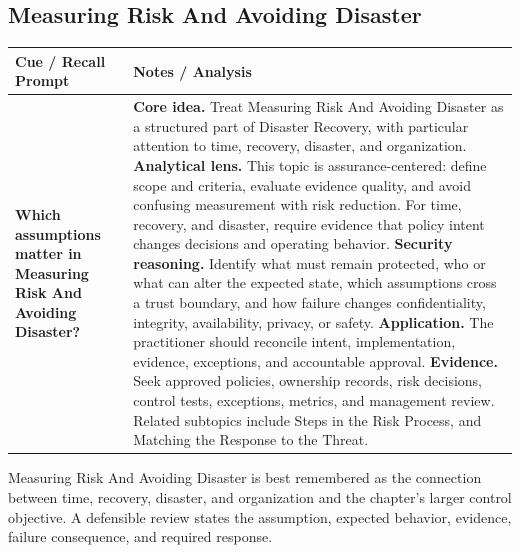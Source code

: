 \documentclass[11pt]{article}
\newcommand{\CornellHeader}{%
\rowcolor{Navy}\color{white}\bfseries Cue / Recall Prompt & \color{white}\bfseries Notes / Analysis\\\hline}
\newcommand{\CornellRow}[2]{%
\cellcolor{CueGray}\RaggedRight\textbf{#1} & \RaggedRight #2\\\hline}
\begin{document}
\subsection*{Measuring Risk And Avoiding Disaster}
\begin{longtable}{>{\RaggedRight\arraybackslash}p{}|>{\RaggedRight\arraybackslash}p{}}
\CornellHeader
\CornellRow{Which assumptions matter in Measuring Risk And Avoiding Disaster?}{\textbf{Core idea.} Treat Measuring Risk And Avoiding Disaster as a structured part of Disaster Recovery, with particular attention to time, recovery, disaster, and organization. \textbf{Analytical lens.} This topic is assurance-centered: define scope and criteria, evaluate evidence quality, and avoid confusing measurement with risk reduction. For time, recovery, and disaster, require evidence that policy intent changes decisions and operating behavior. \textbf{Security reasoning.} Identify what must remain protected, who or what can alter the expected state, which assumptions cross a trust boundary, and how failure changes confidentiality, integrity, availability, privacy, or safety. \textbf{Application.} The practitioner should reconcile intent, implementation, evidence, exceptions, and accountable approval. \textbf{Evidence.} Seek approved policies, ownership records, risk decisions, control tests, exceptions, metrics, and management review. Related subtopics include Steps in the Risk Process, and Matching the Response to the Threat.}
\end{longtable}
\begin{topicsummary}
Measuring Risk And Avoiding Disaster is best remembered as the connection between time, recovery, disaster, and organization and the chapter's larger control objective. A defensible review states the assumption, expected behavior, evidence, failure consequence, and required response.
\end{topicsummary}
\end{document}
